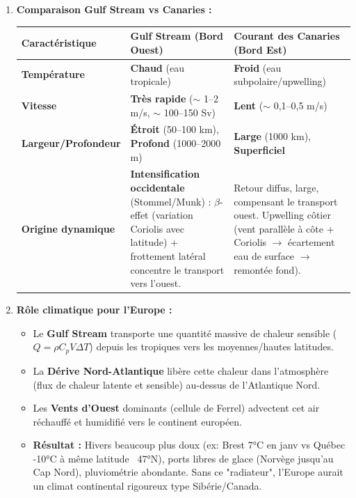 \documentclass[11pt]{article}
\begin{document}
\begin{exoresolu}
\begin{enumerate}
\begin{itemize}
          \end{itemize}
    \item \textbf{Comparaison Gulf Stream vs Canaries :}
          \begin{center}
              \begin{tabularx}{\linewidth}{|l|X|X|}\hline
                  \rowcolor{popblueL} \textbf{Caractéristique} & \textbf{Gulf Stream (Bord Ouest)} & \textbf{Courant des Canaries (Bord Est)} \\ \hline
                  \textbf{Température} & \textbf{Chaud} (eau tropicale) & \textbf{Froid} (eau subpolaire/upwelling) \\ \hline
                  \textbf{Vitesse} & \textbf{Très rapide} ($\sim$ 1--2 m/s, $\sim$ 100--150 Sv) & \textbf{Lent} ($\sim$ 0,1--0,5 m/s) \\ \hline
                  \textbf{Largeur/Profondeur} & \textbf{Étroit} (50--100 km), \textbf{Profond} (1000--2000 m) & \textbf{Large} (1000 km), \textbf{Superficiel} \\ \hline
                  \textbf{Origine dynamique} & \textbf{Intensification occidentale} (Stommel/Munk) : $\beta$-effet (variation Coriolis avec latitude) + frottement latéral concentre le transport vers l'ouest. & Retour diffus, large, compensant le transport ouest. Upwelling côtier (vent parallèle à côte + Coriolis $\rightarrow$ écartement eau de surface $\rightarrow$ remontée fond). \\ \hline
              \end{tabularx}
          \end{center}
    \item \textbf{Rôle climatique pour l'Europe :}
          \begin{itemize}
              \item Le \textbf{Gulf Stream} transporte une quantité massive de chaleur sensible ($Q = \rho C_p V \Delta T$) depuis les tropiques vers les moyennes/hautes latitudes.
              \item La \textbf{Dérive Nord-Atlantique} libère cette chaleur dans l'atmosphère (flux de chaleur latente et sensible) au-dessus de l'Atlantique Nord.
              \item Les \textbf{Vents d'Ouest} dominants (cellule de Ferrel) advectent cet air réchauffé et humidifié vers le continent européen.
              \item \textbf{Résultat :} Hivers beaucoup plus doux (ex: Brest 7°C en janv vs Québec -10°C à même latitude ~47°N), ports libres de glace (Norvège jusqu'au Cap Nord), pluviométrie abondante. Sans ce "radiateur", l'Europe aurait un climat continental rigoureux type Sibérie/Canada.

\end{itemize}
\end{enumerate}
\end{exoresolu}
\end{document}
